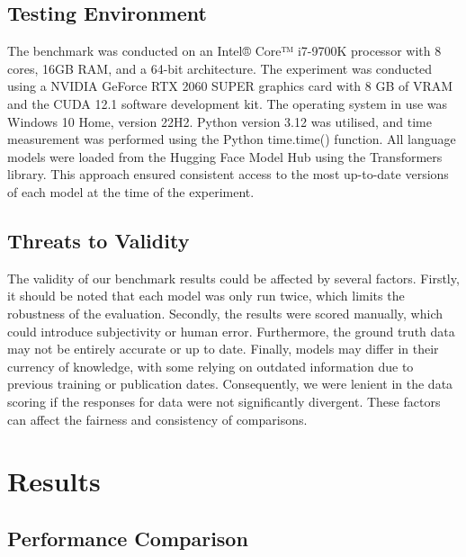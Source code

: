 \documentclass[12pt,a4paper]{article}
\begin{document}
	\subsection{Testing Environment}
	The benchmark was conducted on an Intel® Core™ i7-9700K processor with 8 cores, 16GB RAM, and a 64-bit architecture. The experiment was conducted using a NVIDIA GeForce RTX 2060 SUPER graphics card with 8 GB of VRAM and the CUDA 12.1 software development kit.  The operating system in use was Windows 10 Home, version 22H2. Python version 3.12 was utilised, and time measurement was performed using the Python time.time() function. All language models were loaded from the Hugging Face Model Hub using the Transformers library. This approach ensured consistent access to the most up-to-date versions of each model at the time of the experiment.

	\subsection{Threats to Validity}
		The validity of our benchmark results could be affected by several factors. Firstly, it should be noted that each model was only run twice, which limits the robustness of the evaluation. Secondly, the results were scored manually, which could introduce subjectivity or human error. Furthermore, the ground truth data may not be entirely accurate or up to date. Finally, models may differ in their currency of knowledge, with some relying on outdated information due to previous training or publication dates. Consequently, we were lenient in the data scoring if the responses for data were not significantly divergent. These factors can affect the fairness and consistency of comparisons.
	\section{Results}
	\subsection{Performance Comparison}
	
	\newcommand{\scorecolor}[1]{%
		\ifnum#1=5\cellcolor{excellent}5\else
		\ifnum#1=4\cellcolor{good}4\else
		\ifnum#1=3\cellcolor{fair}3\else
		\ifnum#1=2\cellcolor{poor}2\else
		\cellcolor{bad}1\fi\fi\fi\fi
	}
	
\end{document}
